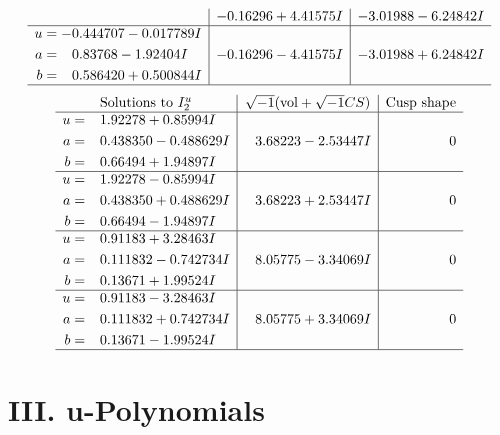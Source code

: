\documentclass[1p]{elsarticle_modified}
\theoremstyle{definition}
\newcommand{\I}{\sqrt{-1}}
\begin{document}
$$\begin{array}{c|c|c}
 & -0.16296 + 4.41575 I & -3.01988 - 6.24842 I \\ \hline\begin{aligned}
u &= -0.444707 - 0.017789 I \\
a &= \phantom{-}0.83768 - 1.92404 I \\
b &= \phantom{-}0.586420 + 0.500844 I\end{aligned}
 & -0.16296 - 4.41575 I & -3.01988 + 6.24842 I\\
 \hline 
 \end{array}$$\newpage$$\begin{array}{c|c|c}  
\text{Solutions to }I^u_{2}& \I (\text{vol} + \sqrt{-1}CS) & \text{Cusp shape}\\
 \hline 
\begin{aligned}
u &= \phantom{-}1.92278 + 0.85994 I \\
a &= \phantom{-}0.438350 - 0.488629 I \\
b &= \phantom{-}0.66494 + 1.94897 I\end{aligned}
 & \phantom{-}3.68223 - 2.53447 I & \phantom{-0.000000 } 0 \\ \hline\begin{aligned}
u &= \phantom{-}1.92278 - 0.85994 I \\
a &= \phantom{-}0.438350 + 0.488629 I \\
b &= \phantom{-}0.66494 - 1.94897 I\end{aligned}
 & \phantom{-}3.68223 + 2.53447 I & \phantom{-0.000000 } 0 \\ \hline\begin{aligned}
u &= \phantom{-}0.91183 + 3.28463 I \\
a &= \phantom{-}0.111832 - 0.742734 I \\
b &= \phantom{-}0.13671 + 1.99524 I\end{aligned}
 & \phantom{-}8.05775 - 3.34069 I & \phantom{-0.000000 } 0 \\ \hline\begin{aligned}
u &= \phantom{-}0.91183 - 3.28463 I \\
a &= \phantom{-}0.111832 + 0.742734 I \\
b &= \phantom{-}0.13671 - 1.99524 I\end{aligned}
 & \phantom{-}8.05775 + 3.34069 I & \phantom{-0.000000 } 0\\
 \hline 
 \end{array}$$\newpage
\newpage\renewcommand{\arraystretch}{1}
\centering \section*{ III. u-Polynomials}
\end{document}
